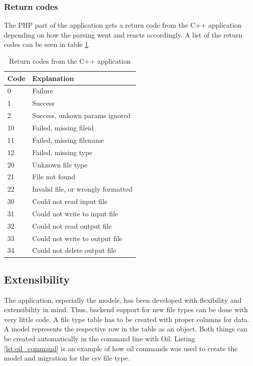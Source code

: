 \subsubsection{Return codes}
\label{sec:return_codes}
The PHP part of the application gets a return code from the C++ application depending on how the parsing went and reacts accordingly. A list of the return codes can be seen in table \ref{tab:cppReturnCodes}.
\begin{table}[htbp]
\centering
\begin{tabular}{|l|l|}
\hline
\textbf{Code} & \textbf{Explanation}\\
\hline
0 & Failure\\
\hline
1 & Success\\
\hline
2 & Success, unkown params ignored\\
\hline
10 & Failed, missing fileid\\
\hline
11 & Failed, missing filename\\
\hline
12 & Failed, missing type\\
\hline
20 & Unknown file type\\
\hline
21 & File not found\\
\hline
22 & Invalid file, or wrongly formatted\\
\hline
30 & Could not read input file\\
\hline
31 & Could not write to input file\\
\hline
32 & Could not read output file\\
\hline
33 & Could not write to output file\\
\hline
34 & Could not delete output file\\
\hline
\end{tabular}
\caption{Return codes from the C++ application}
\label{tab:cppReturnCodes}
\end{table}



\subsection{Extensibility}
\label{sec:extensibility}
The application, especially the models, has been developed with flexibility and extensibility in mind. Thus, backend support for new file types can be done with very little code. A file type table has to be created with proper columns for data. A \textsf{model} represents the respective row in the table as an object. Both things can be created automatically in the command line with \textsf{Oil}. Listing \ref{lst:oil_command} is an example of how oil commands was used to create the model and migration for the csv file type.

